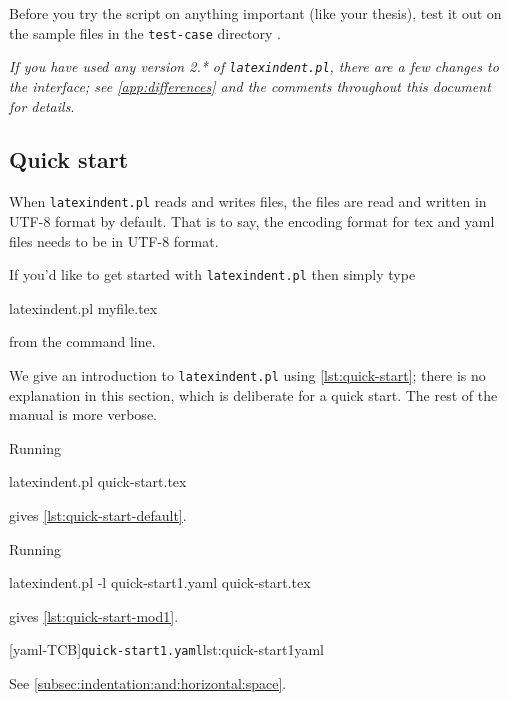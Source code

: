 \documentclass[10pt]{article}
\begin{document}
 \begin{warning}
  Before you try the script on anything important (like your thesis), test it out on the
  sample files in the \texttt{test-case} directory \cite{latexindent-home}.
 \end{warning}

 \emph{If you have used any version 2.* of \texttt{latexindent.pl}, there
 are a few changes to the interface; see \vref{app:differences} and the comments
 throughout this document for details}.

\subsection{Quick start}\label{sec:quickstart}
 When \texttt{latexindent.pl} reads and writes files, the files are read and written in UTF-8 format by default.
 That is to say, the encoding format for tex and yaml files needs to be in UTF-8 format.

 If you'd like to get started with \texttt{latexindent.pl} then simply type

 \begin{commandshell}
latexindent.pl myfile.tex
\end{commandshell}

 from the command line.

 We give an introduction to \texttt{latexindent.pl} using \cref{lst:quick-start}; there
 is no explanation in this section, which is deliberate for a quick start. The rest of
 the manual is more verbose.


 Running

 \begin{commandshell}
latexindent.pl quick-start.tex
\end{commandshell}

 gives \cref{lst:quick-start-default}.


 \begin{example}
 Running

 \begin{commandshell}
latexindent.pl -l quick-start1.yaml quick-start.tex
\end{commandshell}

 gives \cref{lst:quick-start-mod1}.

 \begin{cmhtcbraster}
  [yaml-TCB]{\texttt{quick-start1.yaml}}{lst:quick-start1yaml}
 \end{cmhtcbraster}
 See \cref{subsec:indentation:and:horizontal:space}.
 \end{example}
\end{document}
